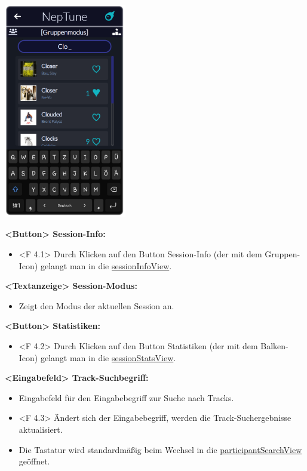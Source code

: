 \documentclass[oneside, ngerman]{sdqtechreport}
\begin{document}
\begin{center}
    \hypertarget{participantSearchView}{}
    \includegraphics[width=0.4\textwidth]{LATEX/Pflichtenheft/GraphicDesigns/userSearchPage.png}
\end{center}

\textbf{<Button> Session-Info:}
\begin{itemize}
    \hypertarget{<F 4.1>}{}
    \item <F 4.1> Durch Klicken auf den Button Session-Info (der mit dem Gruppen-Icon) gelangt man in die \hyperlink{sessionInfoView}{sessionInfoView}.
\end{itemize}

\textbf{<Textanzeige> Session-Modus:}
\begin{itemize}
    \item Zeigt den Modus der aktuellen Session an.
\end{itemize}

\textbf{<Button> Statistiken:}
\begin{itemize}
    \hypertarget{F 4.2>}{}
    \item <F 4.2> Durch Klicken auf den Button Statistiken (der mit dem Balken-Icon) gelangt man in die \hyperlink{sessionStatsView}{sessionStatsView}.
\end{itemize}

\textbf{<Eingabefeld> Track-Suchbegriff:}
\begin{itemize}
    \item Eingabefeld für den Eingabebegriff zur Suche nach Tracks.
    \hypertarget{<F 4.3>}{}
    \item <F 4.3> Ändert sich der Eingabebegriff, werden die Track-Suchergebnisse aktualisiert.
    \item Die Tastatur wird standardmäßig beim Wechsel in die \hyperlink{participantSearchView}{participantSearchView} geöffnet.
\end{itemize}
\end{document}
